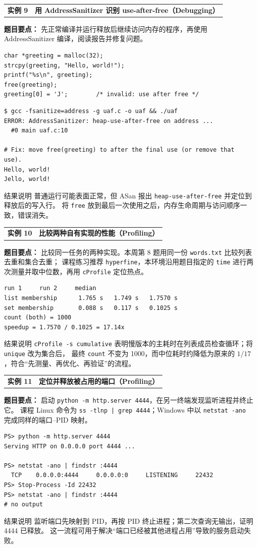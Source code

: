 \documentclass[UTF8,zihao=-4]{ctexart}
\newcommand{\practicebanner}[2]{
  \begin{tcolorbox}[
    colback=soft,
    colframe=navy,
    boxrule=1pt,
    arc=2mm,
    left=4mm,right=4mm,top=2.5mm,bottom=2.5mm]
    \begin{tabularx}{\textwidth}{>{\Large\bfseries\color{navy}}p{2.7cm}X}
      实例 #1 & {\large\bfseries\color{navy}#2}
    \end{tabularx}
  \end{tcolorbox}
}
\begin{document}
\clearpage
\practicebanner{9}{用 AddressSanitizer 识别 use-after-free（Debugging）}
\textbf{题目要点：} 先正常编译并运行释放后继续访问内存的程序，再使用 AddressSanitizer 编译，阅读报告并修复问题。
\begin{lstlisting}[style=c]
char *greeting = malloc(32);
strcpy(greeting, "Hello, world!");
printf("%s\n", greeting);
free(greeting);
greeting[0] = 'J';        /* invalid: use after free */
\end{lstlisting}
\begin{lstlisting}[style=shell]
$ gcc -fsanitize=address -g uaf.c -o uaf && ./uaf
ERROR: AddressSanitizer: heap-use-after-free on address ...
  #0 main uaf.c:10

# Fix: move free(greeting) to after the final use (or remove that use).
Hello, world!
Jello, world!
\end{lstlisting}
\begin{summarybox}{结果说明}
普通运行可能表面正常，但 ASan 报出 \texttt{heap-use-after-free} 并定位到释放后的写入行。
将 \texttt{free} 放到最后一次使用之后，内存生命周期与访问顺序一致，错误消失。
\end{summarybox}

\vspace{0.5cm}
\practicebanner{10}{比较两种自有实现的性能（Profiling）}
\textbf{题目要点：} 比较同一任务的两种实现。本周第 8 题用同一份 \texttt{words.txt} 比较列表去重和集合去重；
课程练习推荐 \texttt{hyperfine}，本环境沿用题目指定的 \texttt{time} 进行两次测量并取中位数，再用 \texttt{cProfile} 定位热点。
\begin{lstlisting}[style=output]
                      run 1     run 2     median
list membership      1.765 s   1.749 s   1.7570 s
set membership       0.088 s   0.117 s   0.1025 s
count (both) = 1000
speedup = 1.7570 / 0.1025 = 17.14x
\end{lstlisting}
\begin{summarybox}{结果说明}
\texttt{cProfile -s cumulative} 表明慢版本的主耗时在列表成员检查循环；将 \texttt{unique} 改为集合后，
最终 \texttt{count} 不变为 1000，而中位耗时约降低为原来的 $1/17$，符合“先测量、再优化、再验证”的流程。
\end{summarybox}

\practicebanner{11}{定位并释放被占用的端口（Profiling）}
\textbf{题目要点：} 启动 \texttt{python -m http.server 4444}，在另一终端发现监听进程并终止它。
课程 Linux 命令为 \texttt{ss -tlnp | grep 4444}；Windows 中以 \texttt{netstat -ano} 完成同样的端口--PID 映射。
\begin{lstlisting}[style=shell]
PS> python -m http.server 4444
Serving HTTP on 0.0.0.0 port 4444 ...

PS> netstat -ano | findstr :4444
  TCP    0.0.0.0:4444     0.0.0.0:0     LISTENING     22432
PS> Stop-Process -Id 22432
PS> netstat -ano | findstr :4444
# no output
\end{lstlisting}
\begin{summarybox}{结果说明}
监听端口先映射到 PID，再按 PID 终止进程；第二次查询无输出，证明 4444 已释放。
这一流程可用于解决“端口已经被其他进程占用”导致的服务启动失败。
\end{summarybox}
\end{document}
